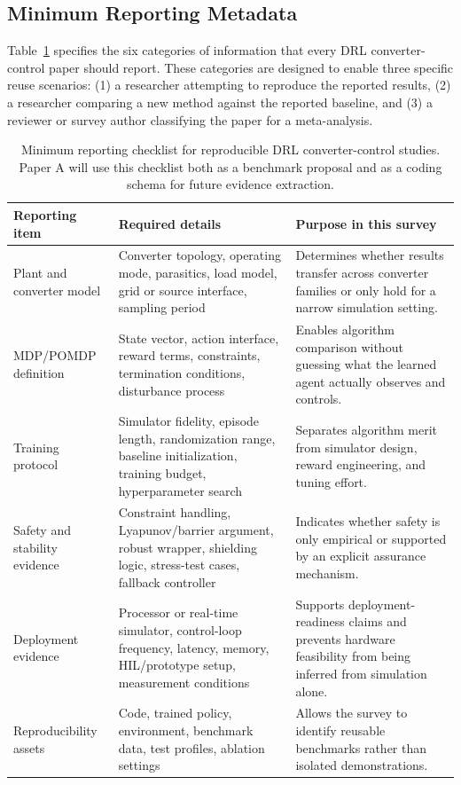 \documentclass[manuscript,screen,review]{acmart}
\begin{document}
\subsection{Minimum Reporting Metadata}

Table~\ref{tab:reproducibility-checklist} specifies the six categories of information that every DRL converter-control paper should report.
These categories are designed to enable three specific reuse scenarios: (1) a researcher attempting to reproduce the reported results, (2) a researcher comparing a new method against the reported baseline, and (3) a reviewer or survey author classifying the paper for a meta-analysis.

\begin{table}[t]
\caption{Minimum reporting checklist for reproducible DRL converter-control studies. Paper A will use this checklist both as a benchmark proposal and as a coding schema for future evidence extraction.}
\label{tab:reproducibility-checklist}
\begin{tabular}{p{}p{}p{}}
\toprule
Reporting item & Required details & Purpose in this survey \\
\midrule
Plant and converter model & Converter topology, operating mode, parasitics, load model, grid or source interface, sampling period & Determines whether results transfer across converter families or only hold for a narrow simulation setting. \\
MDP/POMDP definition & State vector, action interface, reward terms, constraints, termination conditions, disturbance process & Enables algorithm comparison without guessing what the learned agent actually observes and controls. \\
Training protocol & Simulator fidelity, episode length, randomization range, baseline initialization, training budget, hyperparameter search & Separates algorithm merit from simulator design, reward engineering, and tuning effort. \\
Safety and stability evidence & Constraint handling, Lyapunov/barrier argument, robust wrapper, shielding logic, stress-test cases, fallback controller & Indicates whether safety is only empirical or supported by an explicit assurance mechanism. \\
Deployment evidence & Processor or real-time simulator, control-loop frequency, latency, memory, HIL/prototype setup, measurement conditions & Supports deployment-readiness claims and prevents hardware feasibility from being inferred from simulation alone. \\
Reproducibility assets & Code, trained policy, environment, benchmark data, test profiles, ablation settings & Allows the survey to identify reusable benchmarks rather than isolated demonstrations. \\
\bottomrule
\end{tabular}
\end{table}
\end{document}
